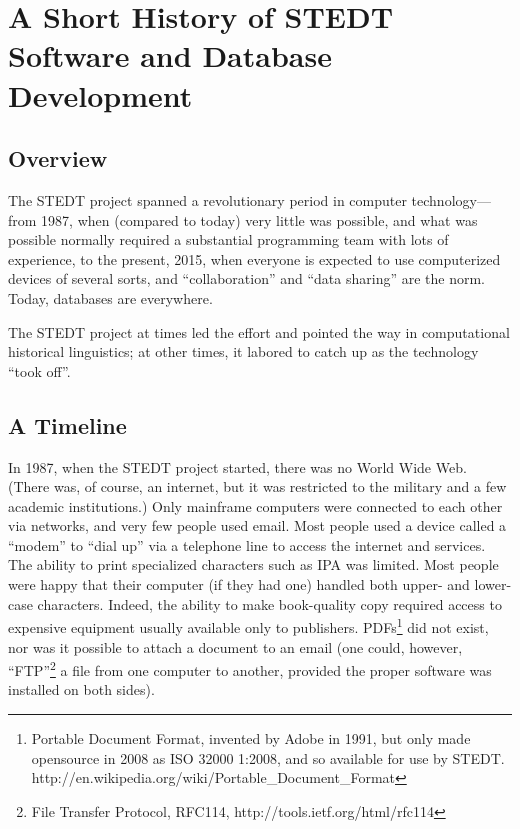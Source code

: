 \vspace{0.25em}

\renewcommand{\thefootnote}{\arabic{footnote}}
\setcounter{footnote}{0}

\chapter*{A Short History of STEDT Software and Database Development}

\section{Overview}

The STEDT project spanned a revolutionary period in computer
technology---from 1987, when (compared to today) very little was possible, and what was
possible normally required a substantial programming team with lots of
experience, to the present, 2015, when everyone is expected to use
computerized devices of several sorts, and  ``collaboration'' and ``data
sharing'' are the norm. Today, databases are everywhere.

The STEDT project at times led the effort and pointed the way in
computational historical linguistics; at other times, it labored to
catch up as the technology ``took off''.

\section{A Timeline}

In 1987, when the STEDT project started, there was no World Wide Web. (There was, of course, an internet, but it was restricted to
the military and a few academic institutions.) Only mainframe
computers were connected to each other via networks, and very few
people used email.  Most people used a device called a ``modem'' to ``dial up'' via a
telephone line to access the internet and services. The ability to print specialized characters such as IPA was
limited. Most people were happy that their computer (if they had one)
handled both upper- and lower-case characters.  
Indeed, the ability to make book-quality copy required access to
expensive equipment usually available only to
publishers. PDFs\footnote{Portable Document Format, invented by Adobe
in 1991, but only made opensource in 2008 as ISO 32000 1:2008, and  
so available for use by STEDT. http://en.wikipedia.org/wiki/Portable\_Document\_Format} did not exist, 
nor was it possible to attach a document to an email (one
could, however, ``FTP''\footnote{File Transfer Protocol, RFC114, http://tools.ietf.org/html/rfc114} a file 
from one computer to another, provided the proper software was installed on both sides).

